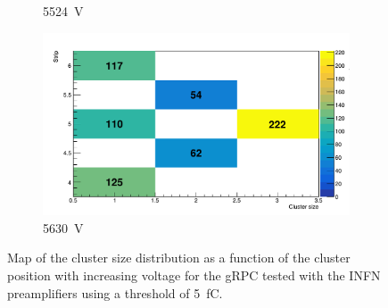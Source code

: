 \begin{figure}[H]
\begin{subfigure}{.33\linewidth}
			\caption{\label{fig:cluster-size-2D:E} \SI{5524}{V}}
		\end{subfigure}
		\begin{subfigure}{.33\linewidth}
		    \centering
			\includegraphics[width=\linewidth]{fig/chapt6/Muon-ClS-5500-gRPC-INFN.pdf}
			\caption{\label{fig:cluster-size-2D:F} \SI{5630}{V}}
		\end{subfigure}
		\caption{\label{fig:cluster-size-2D} Map of the cluster size distribution as a function of the cluster position with increasing voltage for the gRPC tested with the INFN preamplifiers using a threshold of \SI{5}{fC}.}
	\end{figure}
    
